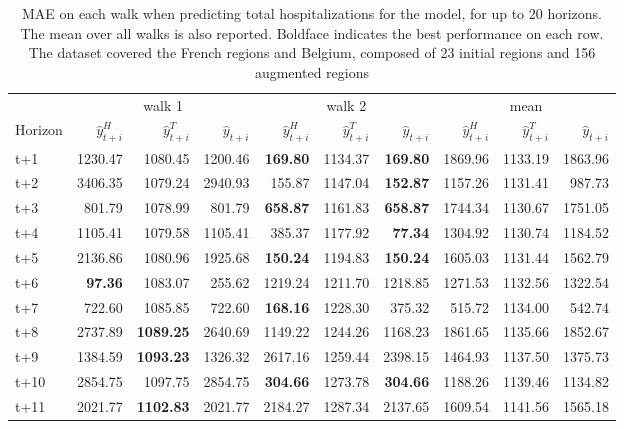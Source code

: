 \begin{table}[H]
\centering
\caption{MAE on each walk when predicting total hospitalizations for the model, for up to 20 horizons. The mean over all walks is also reported. Boldface indicates the best performance on each row. The dataset covered the French regions and Belgium, composed of 23 initial regions and 156 augmented regions }
\label{tab:MAE_walk_assemble}
\begin{tabular}{lrrrrrrrrr}
\toprule
 & \multicolumn{3}{c}{walk 1} & \multicolumn{3}{c}{walk 2} & \multicolumn{3}{c}{mean} 
\\

\cmidrule(lr){2-4} \cmidrule(lr){5-7} \cmidrule(lr){8-10} 
Horizon & $\hat{y}_{t+i}^H$ & $\hat{y}_{t+i}^T$ & $\hat{y}_{t+i}$ & $\hat{y}_{t+i}^H$ & $\hat{y}_{t+i}^T$ & $\hat{y}_{t+i}$ & $\hat{y}_{t+i}^H$ & $\hat{y}_{t+i}^T$ & $\hat{y}_{t+i}$ \\
\midrule
t+1  & 1230.47  & 1080.45  & 1200.46  & \textbf{169.80}  & 1134.37  & \textbf{169.80}  & 1869.96  & 1133.19  & 1863.96  \\
t+2  & 3406.35  & 1079.24  & 2940.93  & 155.87  & 1147.04  & \textbf{152.87}  & 1157.26  & 1131.41  & 987.73  \\
t+3  & 801.79  & 1078.99  & 801.79  & \textbf{658.87}  & 1161.83  & \textbf{658.87}  & 1744.34  & 1130.67  & 1751.05  \\
t+4  & 1105.41  & 1079.58  & 1105.41  & 385.37  & 1177.92  & \textbf{77.34}  & 1304.92  & 1130.74  & 1184.52  \\
t+5  & 2136.86  & 1080.96  & 1925.68  & \textbf{150.24}  & 1194.83  & \textbf{150.24}  & 1605.03  & 1131.44  & 1562.79  \\
t+6  & \textbf{97.36}  & 1083.07  & 255.62  & 1219.24  & 1211.70  & 1218.85  & 1271.53  & 1132.56  & 1322.54  \\
t+7  & 722.60  & 1085.85  & 722.60  & \textbf{168.16}  & 1228.30  & 375.32  & 515.72  & 1134.00  & 542.74  \\
t+8  & 2737.89  & \textbf{1089.25}  & 2640.69  & 1149.22  & 1244.26  & 1168.23  & 1861.65  & 1135.66  & 1852.67  \\
t+9  & 1384.59  & \textbf{1093.23}  & 1326.32  & 2617.16  & 1259.44  & 2398.15  & 1464.93  & 1137.50  & 1375.73  \\
t+10  & 2854.75  & 1097.75  & 2854.75  & \textbf{304.66}  & 1273.78  & \textbf{304.66}  & 1188.26  & 1139.46  & 1134.82  \\
t+11  & 2021.77  & \textbf{1102.83}  & 2021.77  & 2184.27  & 1287.34  & 2137.65  & 1609.54  & 1141.56  & 1565.18  \\

\end{tabular}
\end{table}
